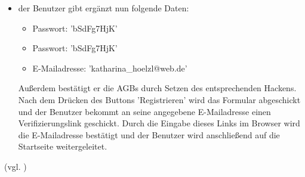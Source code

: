 \documentclass[a4paper]{scrreprt}
\begin{document}
\begin{itemize}
\begin{itemize}
						\item der Benutzer gibt ergänzt nun folgende Daten: 
							\begin{itemize}
								\item Passwort: 'bSdFg7HjK'
								\item Passwort: 'bSdFg7HjK'
								\item E-Mailadresse: 'katharina\_hoelzl@web.de'
							\end{itemize}
						Außerdem bestätigt er die AGBs durch Setzen des entsprechenden Hackens. Nach dem Drücken des Buttons 'Registrieren' wird das Formular abgeschickt und der Benutzer bekommt an seine angegebene E-Mailadresse einen Verifizierungslink geschickt. Durch die Eingabe dieses Links im Browser wird die E-Mailadresse bestätigt und der Benutzer wird anschließend auf die Startseite weitergeleitet.			
				\end{itemize}	
			(vgl. )
		\end{itemize}
		
\end{document}
